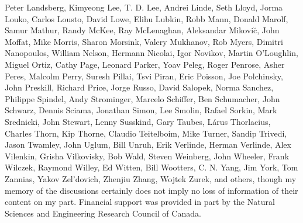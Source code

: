 \documentclass[12pt]{article}
\begin{document}
Peter Landsberg, Kimyeong Lee, T. D. Lee, Andrei Linde,
Seth Lloyd, Jorma Louko, Carlos Lousto, David Lowe,
Elihu Lubkin, Robb Mann, Donald Marolf, Samur Mathur,
Randy McKee, Ray McLenaghan, Aleksandar Mikovi\u{c},
John Moffat, Mike Morris, Sharon Morsink, Valery Mukhanov,
Rob Myers, Dimitri Nanopoulos, William Nelson,
Hermann Nicolai, Igor Novikov, Martin O'Loughlin, Miguel Ortiz,
Cathy Page, Leonard Parker, Yoav Peleg, Roger Penrose,
Asher Peres, Malcolm Perry, Suresh Pillai, Tsvi Piran,
Eric Poisson, Joe Polchinsky, John Preskill, Richard Price,
Jorge Russo, David Salopek, Norma Sanchez, Philippe Spindel,
Andy Strominger, Marcelo Schiffer, Ben Schumacher,
John Schwarz, Dennis Sciama, Jonathan Simon, Lee Smolin,
Rafael Sorkin, Mark Srednicki, John Stewart, Lenny Susskind,
Gary Taubes, L\'{a}rus Thorlacius, Charles Thorn, Kip Thorne,
Claudio Teitelboim, Mike Turner, Sandip Trivedi,
Jason Twamley, John Uglum, Bill Unruh, Erik Verlinde,
Herman Verlinde, Alex Vilenkin, Grisha Vilkovisky, Bob Wald,
Steven Weinberg, John Wheeler, Frank Wilczek, Raymond Willey,
Ed Witten, Bill Wootters, C. N. Yang, Jim York, Tom Zannias,
Yakov Zel'dovich, Zhenjiu Zhang, Wojtek Zurek,
and others, though my memory of the discussions certainly
does not imply no loss of information of their content on my part.
Financial support was provided in part by the Natural Sciences and
Engineering Research Council of Canada.
\end{document}
